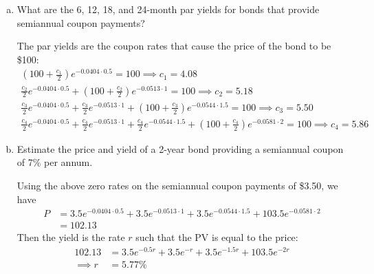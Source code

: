 \documentclass{article}
\begin{document}
\begin{itemize}
\begin{enumerate}[(a)]
			\item What are the 6, 12, 18, and 24-month par yields for bonds that provide semiannual coupon payments?
				\begin{soln}
					The par yields are the coupon rates that cause the price of the bond to be \$100:
					\begin{align*}
						\left( 100+\frac{c_1}{2} \right)e^{-0.0404\cdot 0.5} = 100 \implies c_1 = 4.08 \\
						\frac{c_2}{2}e^{-0.0404\cdot0.5} + \left( 100+\frac{c_2}{2} \right)e^{-0.0513\cdot 1} = 100 \implies c_2 = 5.18 \\
						\frac{c_3}{2}e^{-0.0404\cdot0.5} + \frac{c_3}{2}e^{-0.0513\cdot 1} + \left( 100+\frac{c_3}{2} \right)e^{-0.0544\cdot 1.5} = 100 \implies c_3 = 5.50 \\
						\frac{c_4}{2}e^{-0.0404\cdot0.5}+\frac{c_4}{2}e^{-0.0513\cdot1}+\frac{c_4}{2}e^{-0.0544\cdot 1.5} + \left( 100+\frac{c_4}{2} \right)e^{-0.0581\cdot 2} = 100 \implies c_4 = 5.86
					\end{align*}
				\end{soln}

			\item Estimate the price and yield of a 2-year bond providing a semiannual coupon of 7\% per annum.
				\begin{soln}
					Using the above zero rates on the semiannual coupon payments of \$3.50, we have
					\begin{align*}
						P &= 3.5e^{-0.0404\cdot 0.5} + 3.5e^{-0.0513\cdot1}+3.5e^{-0.0544\cdot 1.5} + 103.5e^{-0.0581\cdot2} \\
						&= 102.13
					\end{align*}
					Then the yield is the rate $r$ such that the PV is equal to the price:
					\begin{align*}
						102.13 &= 3.5e^{-0.5r}+3.5e^{-r}+3.5e^{-1.5r}+103.5e^{-2r} \\
						\implies r &= 5.77\%
					\end{align*}
				\end{soln}
				
		\end{enumerate}
		
\end{itemize}
\end{document}
